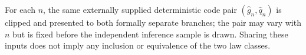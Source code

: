 For each \(n\), the same externally supplied deterministic code pair \((\widehat g_n,\widehat q_n)\) is clipped and presented to both formally separate branches; the pair may vary with \(n\) but is fixed before the independent inference sample is drawn. Sharing these inputs does not imply any inclusion or equivalence of the two law classes.